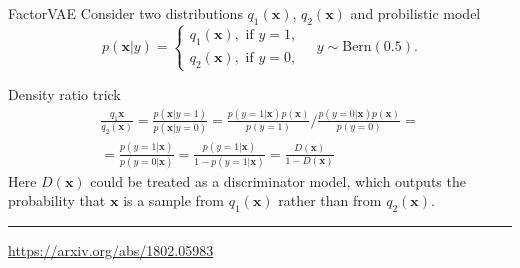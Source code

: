\documentclass{beamer}
\newcommand{\bx}{\mathbf{x}}
\begin{document}
\begin{frame}{FactorVAE}
	Consider two distributions $q_1(\bx)$, $q_2(\bx)$ and probilistic model
	\[
		p(\bx | y) = \begin{cases}
			q_1(\bx), \text{ if } y = 1, \\
			q_2(\bx), \text{ if } y = 0,
		\end{cases}
		\quad 
		y \sim \text{Bern}(0.5).
	\]
	\begin{block}{Density ratio trick}
		\vspace{-0.5cm}
		\begin{multline*}
			\frac{q_1{\bx}}{q_2(\bx)} = \frac{p(\bx | y = 1)}{p(\bx | y = 0)} = \frac{p(y = 1 | \bx) p(\bx)}{p(y=1)} \bigg/ \frac{p(y = 0 | \bx) p(\bx)}{p(y=0)} = \\
			= \frac{p(y = 1 | \bx)}{p(y = 0 | \bx)} = \frac{p(y = 1 | \bx)}{1 - p(y = 1 | \bx)} = \frac{D(\bx)}{1 - D(\bx)}
		\end{multline*}
	Here $D(\bx)$ could be treated as a discriminator model, which outputs the probability that $\bx$ is a sample
	from $q_1(\bx)$ rather than from $q_2(\bx)$.
	\end{block}
	
	\vfill
	\hrule\medskip
	{\scriptsize \href{https://arxiv.org/abs/1802.05983}{https://arxiv.org/abs/1802.05983}}
\end{frame}
\end{document}
